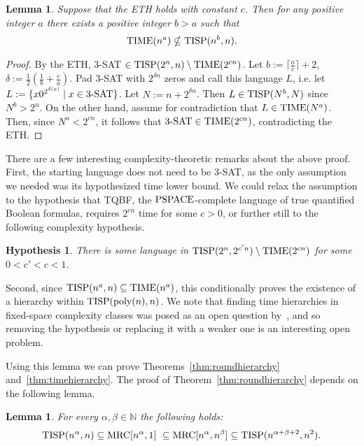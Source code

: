 \documentclass[11pt]{article}
\newtheorem{conjecture}[theorem]{Hypothesis}
\newtheorem{lemma}[theorem]{Lemma}
\theoremstyle{definition}
\theoremstyle{remark}
\newcommand{\mrc}{\textup{MRC}}
\newcommand{\TIME}{\textup{TIME}}
\newcommand{\TISP}{\textup{TISP}}
\newcommand{\PSPACE}{\textup{PSPACE}}
\begin{document}
\begin{lemma}\label{lemma:eth} Suppose that the ETH holds with constant $c$. Then
for any positive integer $a$ there exists a positive integer $b>a$ such that
$$\TIME(n^a) \nsubseteq \TISP(n^b, n).$$ \end{lemma}

\begin{proof}
By the ETH, 3-SAT $\in \TISP(2^n, n)\setminus \TIME(2^{cn})$. Let
$b:=\lceil\frac{a}{c}\rceil+2$, $\delta:=\frac12(\frac1b+\frac{c}{a})$. Pad
3-SAT with $2^{\delta n}$ zeros and call this language $L$, i.e. let $L:=\{x
0^{2^{\delta|x|}} \mid x \in \textup{3-SAT}\}$. Let $N:=n+2^{\delta n}$. Then
$L\in \TISP(N^b, N)$ since $N^b > 2^n$. On the other hand, assume for
contradiction that $L \in \TIME(N^a)$. Then, since $N^a < 2^{cn}$, it follows
that $\textup{3-SAT} \in \TIME(2^{cn})$, contradicting the ETH.
\end{proof}

There are a few interesting complexity-theoretic remarks about the above proof.
First, the starting language does not need to be 3-SAT, as the only assumption
we needed was its hypothesized time lower bound.  We could relax the assumption
to the hypothesis that TQBF,
the $\PSPACE$-complete language of true quantified Boolean formulas,
requires $2^{cn}$ time for some $c > 0$, or further still to the following complexity hypothesis.

\begin{conjecture} \label{conj:weaketh}
There is some language in $\TISP(2^n, 2^{c'n}) \setminus \TIME(2^{cn})$ for
some $0 < c' < c < 1$.
\end{conjecture}

Second, since $\TISP(n^a, n) \subseteq \TIME(n^a)$, this conditionally proves the
existence of a hierarchy within $\TISP(\textup{poly}(n), n)$. We note that
finding time hierarchies in fixed-space complexity classes was posed as an open
question by~\cite{WagnerW86}, and so removing the hypothesis or replacing it
with a weaker one is an interesting open problem.

Using this lemma we can prove Theorems~\ref{thm:roundhierarchy}
and~\ref{thm:timehierarchy}. The proof of Theorem~\ref{thm:roundhierarchy}
depends on the following lemma.

\begin{lemma} \label{lem:tisprelation}
For every $\alpha, \beta \in \mathbb N$ the following holds: $$ \TISP(n^\alpha,
n)  \subseteq \mrc[n^\alpha, 1] \ \subseteq \mrc[n^\alpha, n^\beta] \subseteq
\TISP(n^{\alpha+\beta+2}, n^2).$$
\end{lemma}
\end{document}
